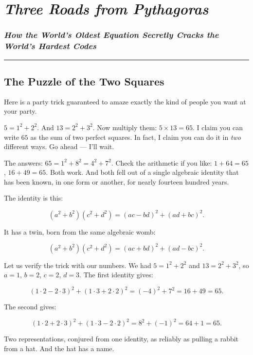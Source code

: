 \chapter{\texorpdfstring{\emph{Three Roads from Pythagoras}}{Three Roads from Pythagoras}}
\subsection{\texorpdfstring{\emph{How the World's Oldest Equation Secretly Cracks the World's Hardest Codes}}{How the World's Oldest Equation Secretly Cracks the World's Hardest Codes}}
\bigskip\noindent\rule{\linewidth}{0.4pt}\bigskip

\section{The Puzzle of the Two Squares}
Here is a party trick guaranteed to amaze exactly the kind of people you want at your party.

\(5 = 1^2 + 2^2\). And \(13 = 2^2 + 3^2\). Now multiply them: \(5 \times 13 = 65\). I claim you can write \(65\) as the sum of two perfect squares. In fact, I claim you can do it in \emph{two} different ways. Go ahead --- I'll wait.

The answers: \(65 = 1^2 + 8^2 = 4^2 + 7^2\). Check the arithmetic if you like: \(1 + 64 = 65\), \(16 + 49 = 65\). Both work. And both fell out of a single algebraic identity that has been known, in one form or another, for nearly fourteen hundred years.

The identity is this:

\[(a^2 + b^2)(c^2 + d^2) = (ac - bd)^2 + (ad + bc)^2.\]

It has a twin, born from the same algebraic womb:

\[(a^2 + b^2)(c^2 + d^2) = (ac + bd)^2 + (ad - bc)^2.\]

Let us verify the trick with our numbers. We had \(5 = 1^2 + 2^2\) and \(13 = 2^2 + 3^2\), so \(a = 1\), \(b = 2\), \(c = 2\), \(d = 3\). The first identity gives:

\[(1 \cdot 2 - 2 \cdot 3)^2 + (1 \cdot 3 + 2 \cdot 2)^2 = (-4)^2 + 7^2 = 16 + 49 = 65.\]

The second gives:

\[(1 \cdot 2 + 2 \cdot 3)^2 + (1 \cdot 3 - 2 \cdot 2)^2 = 8^2 + (-1)^2 = 64 + 1 = 65.\]

Two representations, conjured from one identity, as reliably as pulling a rabbit from a hat. And the hat has a name.


